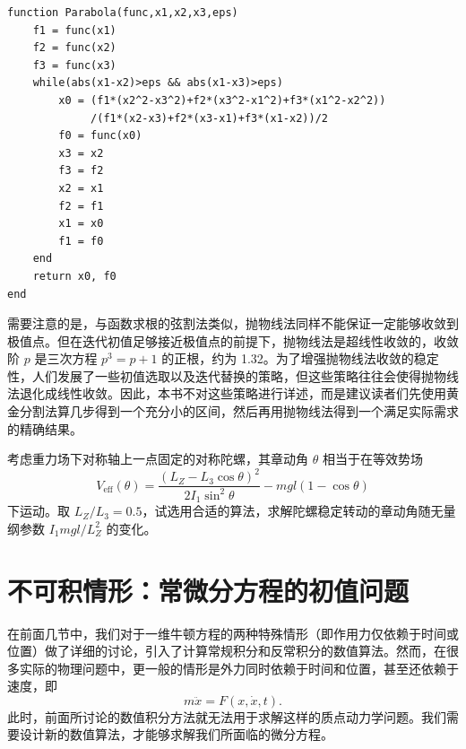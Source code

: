 \begin{algorithmBox}
\begin{lstlisting}[style=bellacode]
function Parabola(func,x1,x2,x3,eps)
    f1 = func(x1)
    f2 = func(x2)
    f3 = func(x3)
    while(abs(x1-x2)>eps && abs(x1-x3)>eps)
        x0 = (f1*(x2^2-x3^2)+f2*(x3^2-x1^2)+f3*(x1^2-x2^2))
             /(f1*(x2-x3)+f2*(x3-x1)+f3*(x1-x2))/2
        f0 = func(x0)
        x3 = x2
        f3 = f2
        x2 = x1
        f2 = f1
        x1 = x0
        f1 = f0
    end
    return x0, f0
end
\end{lstlisting}
\end{algorithmBox}

需要注意的是，与函数求根的弦割法类似，抛物线法同样不能保证一定能够收敛到极值点。但在迭代初值足够接近极值点的前提下，抛物线法是超线性收敛的，收敛阶 $p$ 是三次方程 $p^3=p+1$ 的正根，约为 1.32。为了增强抛物线法收敛的稳定性，人们发展了一些初值选取以及迭代替换的策略，但这些策略往往会使得抛物线法退化成线性收敛。因此，本书不对这些策略进行详述，而是建议读者们先使用黄金分割法算几步得到一个充分小的区间，然后再用抛物线法得到一个满足实际需求的精确结果。

\begin{exerciseBox}[练习 2.4]
考虑重力场下对称轴上一点固定的对称陀螺，其章动角 $\theta$ 相当于在等效势场
\[
V_{\mathrm{eff}}(\theta)=\frac{(L_Z-L_3\cos\theta)^2}{2I_1\sin^2\theta}-mgl(1-\cos\theta)
\]
下运动。取 $L_Z/L_3=0.5$，试选用合适的算法，求解陀螺稳定转动的章动角随无量纲参数 $I_1mgl/L_Z^2$ 的变化。
\end{exerciseBox}


\section{不可积情形：常微分方程的初值问题}

在前面几节中，我们对于一维牛顿方程的两种特殊情形（即作用力仅依赖于时间或位置）做了详细的讨论，引入了计算常规积分和反常积分的数值算法。然而，在很多实际的物理问题中，更一般的情形是外力同时依赖于时间和位置，甚至还依赖于速度，即
\[
m\ddot{x}=F(x,\dot{x},t).
\]
此时，前面所讨论的数值积分方法就无法用于求解这样的质点动力学问题。我们需要设计新的数值算法，才能够求解我们所面临的微分方程。

